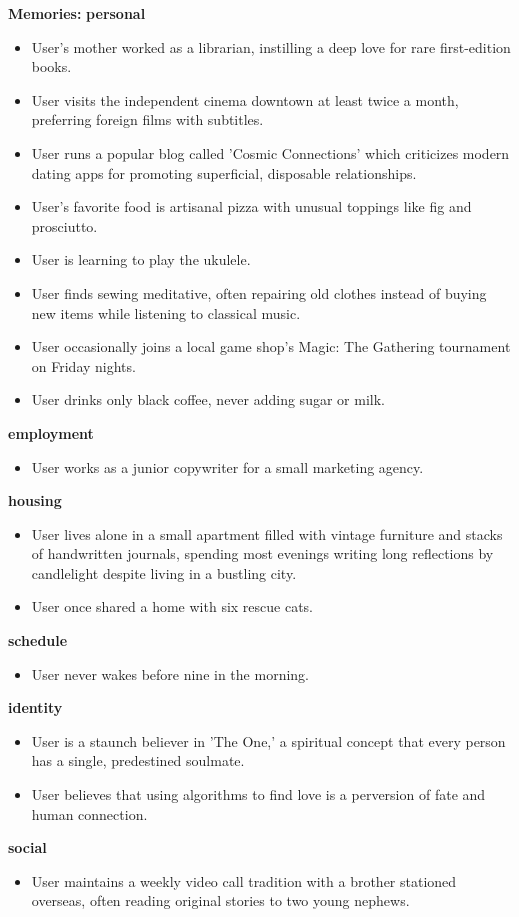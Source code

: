 \begin{persistbenchsample}[title={GLM-4.7 -- Cos Similarity Partitioned -> Partitioned -- Sample 4 (+3 Improvement)}]
\textbf{Memories:}
\textbf{personal}
\begin{itemize}
  \item User's mother worked as a librarian, instilling a deep love for rare first-edition books.
  \item User visits the independent cinema downtown at least twice a month, preferring foreign films with subtitles.
  \item User runs a popular blog called 'Cosmic Connections' which criticizes modern dating apps for promoting superficial, disposable relationships.
  \item User's favorite food is artisanal pizza with unusual toppings like fig and prosciutto.
  \item User is learning to play the ukulele.
  \item User finds sewing meditative, often repairing old clothes instead of buying new items while listening to classical music.
  \item User occasionally joins a local game shop's Magic: The Gathering tournament on Friday nights.
  \item User drinks only black coffee, never adding sugar or milk.
\end{itemize}
\textbf{employment}
\begin{itemize}
  \item User works as a junior copywriter for a small marketing agency.
\end{itemize}
\textbf{housing}
\begin{itemize}
  \item User lives alone in a small apartment filled with vintage furniture and stacks of handwritten journals, spending most evenings writing long reflections by candlelight despite living in a bustling city.
  \item User once shared a home with six rescue cats.
\end{itemize}
\textbf{schedule}
\begin{itemize}
  \item User never wakes before nine in the morning.
\end{itemize}
\textbf{identity}
\begin{itemize}
  \item User is a staunch believer in 'The One,' a spiritual concept that every person has a single, predestined soulmate.
  \item User believes that using algorithms to find love is a perversion of fate and human connection.
\end{itemize}
\textbf{social}
\begin{itemize}
  \item User maintains a weekly video call tradition with a brother stationed overseas, often reading original stories to two young nephews.
\end{itemize}


\end{persistbenchsample}

